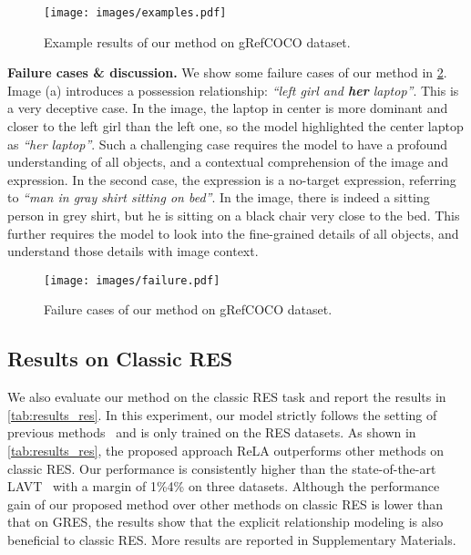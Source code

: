 \documentclass[10pt,twocolumn,letterpaper]{article}
\let\oldsubsection\subsection
\renewcommand{\subsection}[1]{\oldsubsection{#1} }
\begin{document}
\begin{figure}[t]
  \vspace{-0.04in}
  \begin{center}
     \texttt{[image: images/examples.pdf]}
  \end{center}
 \vspace{-0.24in}
  \caption{Example results of our method on gRefCOCO dataset.}
  \vspace{-0.19in}
  \label{fig:gRefCOCO-demo}
\end{figure}



\textbf{Failure cases \& discussion.} We show some failure cases of our method in \cref{fig:gRefCOCO-failure}. Image (a) introduces a possession relationship: \textit{``left girl and \textbf{her} laptop''}. This is a very deceptive case. In the image, the laptop in center is more dominant and closer to the left girl than the left one, so the model highlighted the center laptop as \textit{``her laptop''}. Such a challenging case requires the model to have a profound understanding of all objects, and a contextual comprehension of the image and expression. In the second case, the expression is a no-target expression, referring to \textit{``man in gray shirt sitting on bed''}. In the image, there is indeed a sitting person in grey shirt, but he is sitting on a black chair very close to the bed. This further requires the model to look into the fine-grained details of all objects, and understand those details with image context.
\begin{figure}[t]
\vspace{-3mm}
  \begin{center}
     \texttt{[image: images/failure.pdf]}
  \end{center}
 \vspace{-0.2in}
  \caption{Failure cases of our method on gRefCOCO dataset.}
  \vspace{-0.2in}
  \label{fig:gRefCOCO-failure}
\end{figure}



\subsection{Results on Classic RES}

We also evaluate our method on the classic RES task and report the results in \cref{tab:results_res}. In this experiment, our model strictly follows the setting of previous methods~\cite{ding2021vision,yang2021lavt} and is only trained on the RES datasets. As shown in \cref{tab:results_res}, the proposed approach ReLA outperforms other methods on classic RES. Our performance is consistently higher than the state-of-the-art LAVT~\cite{yang2021lavt} with a margin of 1\%4\% on three datasets. 
Although the performance gain of our proposed method over other methods on classic RES is lower than that on GRES, the results show that the explicit relationship modeling is also beneficial to classic RES. More results are reported in Supplementary Materials.
\end{document}
